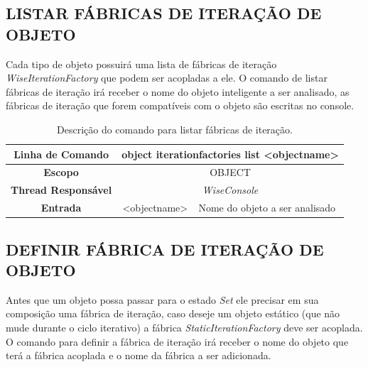 \subsection{LISTAR FÁBRICAS DE ITERAÇÃO DE OBJETO}\label{sec:iteration_factories_list}

Cada tipo de objeto possuirá uma lista de fábricas de iteração \textit{WiseIteration}\textit{Factory} que podem ser acopladas a ele. O comando de listar fábricas de iteração irá receber o nome do objeto inteligente a ser analisado, as fábricas de iteração que forem compatíveis com o objeto são escritas no console.

\begin{center}
	\begin{table}[!htbp]
		\begin{tabularx}{\textwidth}{c|c|X}
			\toprule
			\textbf{Linha de Comando} & \multicolumn{2}{c}{object iteration\underline{\space\space}factories list <object\underline{\space\space}name>} \\
			\midrule
			\textbf{Escopo} & \multicolumn{2}{c}{OBJECT} \\
			\hline
			\textbf{Thread Responsável} & \multicolumn{2}{c}{\textit{WiseConsole}} \\
			\hline
			\textbf{Entrada} & <object\underline{\space\space}name> & Nome do objeto a ser analisado \\
			\bottomrule
		\end{tabularx}
		\caption{Descrição do comando para listar fábricas de iteração.}
		\label{tab:iteration_factories_list}
	\end{table}
\end{center}

\subsection{DEFINIR FÁBRICA DE ITERAÇÃO DE OBJETO}\label{sec:iteration_factories_set}

Antes que um objeto possa passar para o estado \textit{Set} ele precisar em sua composição uma fábrica de iteração, caso deseje um objeto estático (que não mude durante o ciclo iterativo) a fábrica \textit{StaticIterationFactory} deve ser acoplada. O comando para definir a fábrica de iteração irá receber o nome do objeto que terá a fábrica acoplada e o nome da fábrica a ser adicionada.

